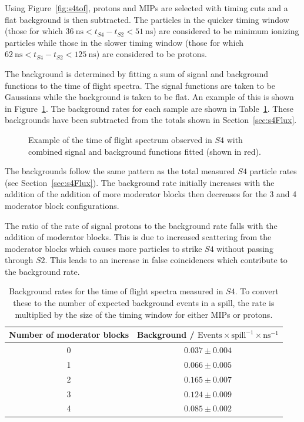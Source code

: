 Using Figure~\ref{fig:s4tof}, protons and MIPs are selected with timing cuts and a flat background is then subtracted.
The particles in the quicker timing window (those for which $36~\text{ns}<t_{\mathit{S4}}-t_{\mathit{S2}}<51~\text{ns}$) are considered to be minimum ionizing particles while those in the slower timing window (those for which $62~\text{ns}<t_{\mathit{S4}}-t_{\mathit{S2}}<125~\text{ns}$) are considered to be protons.

The background is determined by fitting a sum of signal and background functions to the time of flight spectra.
The signal functions are taken to be Gaussians while the background is taken to be flat. 
An example of this is shown in Figure~\ref{fig:fitEx}.
The background rates for each sample are shown in Table~\ref{tab:backgrounds}.
These backgrounds have been subtracted from the totals shown in Section~\ref{sec:s4Flux}.

\begin{figure}[h]
  \begin{adjustbox}{max totalsize={.75\textwidth}{.62\textheight},center}
    
  \end{adjustbox}
  \caption{Example of the time of flight spectrum observed in $\mathit{S4}$ with combined signal and background functions fitted (shown in red).}
  \label{fig:fitEx}
\end{figure}

The backgrounds follow the same pattern as the total measured $\mathit{S4}$ particle rates (see Section~\ref{sec:s4Flux}).
The background rate initially increases with the addition of the addition of more moderator blocks then decreases for the 3 and 4 moderator block configurations.

The ratio of the rate of signal protons to the background rate falls with the addition of moderator blocks.
This is due to increased scattering from the moderator blocks which causes more particles to strike $\mathit{S4}$ without passing through $\mathit{S2}$.
This leads to an increase in false coincidences which contribute to the background rate.

\begin{table}
  \centering
  \caption{Background rates for the time of flight spectra measured in $\mathit{S4}$. To convert these to the number of expected background events in a spill, the rate is multiplied by the size of the timing window for either MIPs or protons.}
  \begin{tabular}{c|c}
    \hline
    \hline
    Number of moderator blocks & Background / $\text{Events} \times \text{spill}^{-1} \times \text{ns}^{-1}$ \\
    \hline
    0 & $0.037 \pm 0.004$ \\
    1 & $0.066 \pm 0.005$ \\
    2 & $0.165 \pm 0.007$ \\
    3 & $0.124 \pm 0.009$ \\
    4 & $0.085 \pm 0.002$ \\
    \hline
  \end{tabular}
  \label{tab:backgrounds}
\end{table}



